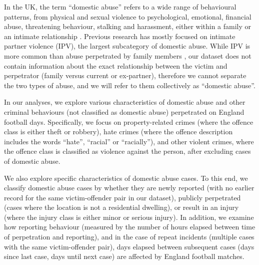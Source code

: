 \documentclass[12pt, a4paper]{article}
\begin{document}


In the UK, the term ``domestic abuse'' refers to a wide range of behavioural patterns, from physical and sexual violence to psychological, emotional, financial abuse, threatening behaviour, stalking and harassment, either within a family or an intimate relationship \cite{ONS}. Previous research has mostly focused on intimate partner violence (IPV), the largest subcategory of domestic abuse. While IPV is more common than abuse perpetrated by family members \cite{ONS}, our dataset does not contain information about the exact relationship between the victim and perpetrator (family versus current or ex-partner), therefore we cannot separate the two types of abuse, and we will refer to them collectively as ``domestic abuse''.

In our analyses, we explore various characteristics of domestic abuse and other criminal behaviours (not classified as domestic abuse) perpetrated on England football days. Specifically, we focus on property-related crimes (where the offence class is either theft or robbery), hate crimes (where the offence description includes the words ``hate'', ``racial'' or ``racially''), and other violent crimes, where the offence class is classified as violence against the person, after excluding cases of domestic abuse.

We also explore specific characteristics of domestic abuse cases. To this end, we classify domestic abuse cases by whether they are newly reported (with no earlier record for the same victim-offender pair in our dataset), publicly perpetrated (cases where the location is not a residential dwelling), or result in an injury (where the injury class is either minor or serious injury). In addition, we examine how reporting behaviour (measured by the number of hours elapsed between time of perpetration and reporting), and in the case of repeat incidents (multiple cases with the same victim-offender pair), days elapsed between subsequent cases (days since last case, days until next case) are affected by England football matches.
\end{document}
